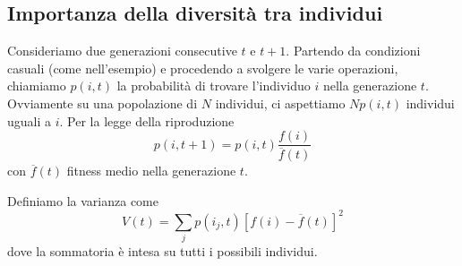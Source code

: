 \documentclass[a4paper, 11pt]{article}
\begin{document}
\subsection{Importanza della diversit\`a tra individui}

Consideriamo due generazioni consecutive $t$ e $t+1$. Partendo da condizioni
casuali (come nell'esempio) e procedendo a svolgere le varie operazioni,
chiamiamo $p(i,t)$ la probabilit\`a di trovare l'individuo $i$ nella
generazione $t$. Ovviamente su una popolazione di $N$ individui, ci aspettiamo
$Np(i,t)$ individui uguali a $i$. Per la legge della riproduzione
$$p(i, t+1) = p(i,t) \frac{f(i)}{\overline{f}(t)}$$
con $\overline{f}(t)$ fitness medio nella generazione $t$.

Definiamo la varianza come 
$$V(t) = \sum\limits_j p(i_j, t) \left[f(i)- \overline{f}(t)\right]^2$$
dove la sommatoria \`e intesa su tutti i possibili individui.
\end{document}
